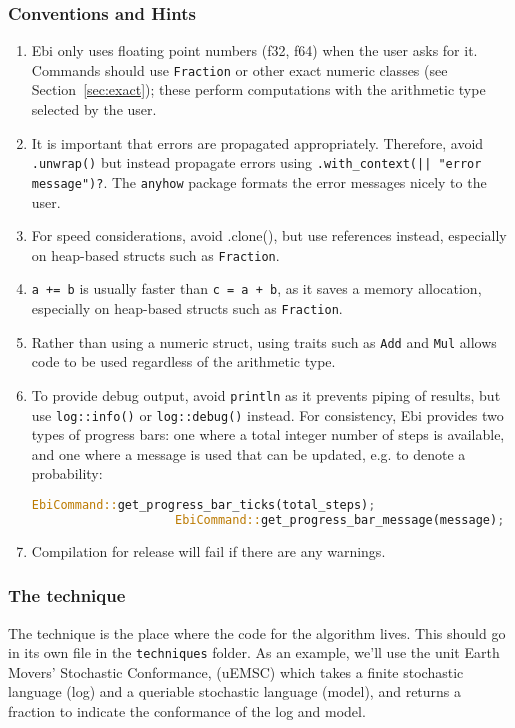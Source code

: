 \documentclass{article}
\begin{document}
		\subsubsection{Conventions and Hints}
			\begin{enumerate}
				\item Ebi only uses floating point numbers (f32, f64) when the user asks for it.
				Commands should use \verb=Fraction= or other exact numeric classes (see Section~\ref{sec:exact}); these perform computations with the arithmetic type selected by the user.
				\item It is important that errors are propagated appropriately.
				Therefore, avoid \verb=.unwrap()= but instead propagate errors using \verb=.with_context(|| "error message")?=.
				The \verb=anyhow= package formats the error messages nicely to the user.
				\item For speed considerations, avoid .clone(), but use references instead, especially on heap-based structs such as \verb=Fraction=.
				\item \verb|a += b| is usually faster than \verb|c = a + b|, as it saves a memory allocation, especially on heap-based structs such as \verb=Fraction=.
				\item Rather than using a numeric struct, using traits such as \verb=Add= and \verb=Mul= allows code to be used regardless of the arithmetic type.
				\item To provide debug output, avoid \verb=println= as it prevents piping of results, but use \verb=log::info()= or \verb=log::debug()= instead.
				For consistency, Ebi provides two types of progress bars: one where a total integer number of steps is available, and one where a message is used that can be updated, e.g. to denote a probability:
				\begin{lstlisting}[language=Rust, style=boxed]
					EbiCommand::get_progress_bar_ticks(total_steps);
					EbiCommand::get_progress_bar_message(message);
				\end{lstlisting}
                \item Compilation for release will fail if there are any warnings.
			\end{enumerate}
            
		\subsubsection{The technique}
			The technique is the place where the code for the algorithm lives.
			This should go in its own file in the \verb=techniques= folder.
			As an example, we'll use the unit Earth Movers' Stochastic Conformance, (uEMSC) which takes a finite stochastic language (log) and a queriable stochastic language (model), and returns a fraction to indicate the conformance of the log and model.
			
\end{document}

